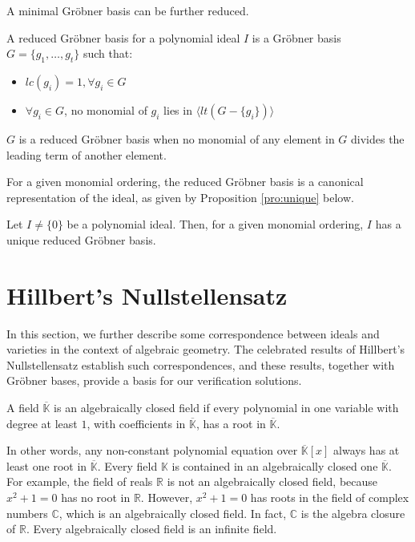 A minimal Gr\"obner basis can be further reduced.
\begin{Definition}
	A {reduced Gr\"obner basis} for a polynomial ideal $I$ is a Gr\"obner basis $G=\{g_{1},\dots,g_{t}\}$ such that:
	\begin{itemize}
		\item $lc(g_{i})=1,\forall g_{i}\in G$
		\item $\forall g_{i} \in G$, no monomial of $g_{i}$ lies in $\langle lt(G-\{g_{i}\})\rangle$
	\end{itemize}
\end{Definition}
$G$ is a reduced Gr\"obner basis when no monomial of any element in $G$ divides the leading term of another element.

For a given monomial ordering, 
the reduced Gr\"obner basis is a canonical representation of the ideal, as given by Proposition \ref{pro:unique} below.


\begin{Proposition}\label{pro:unique}
Let $I \neq \{0\}$ be a polynomial ideal. Then, for a given monomial ordering, $I$ has a unique reduced Gr\"obner basis.
\end{Proposition}

\section{Hillbert's Nullstellensatz}

In this section, we further describe some correspondence between ideals and varieties in
the context of algebraic geometry. The celebrated results of Hillbert's Nullstellensatz
establish such correspondences, and these results, together with Gr\"obner bases, 
provide a basis for our verification solutions. 

\begin{Definition}\label{def:acf}
A field $\overline {\mathbb{K}}$ is an algebraically closed field if every polynomial in one variable with degree at least $1$, with coefficients 
in $\overline {\mathbb{K}}$, has a root in $\overline {\mathbb{K}}$.
\end{Definition}
In other words, any non-constant polynomial equation over $\overline {\mathbb{K}}\left[x\right]$ always has at least one root 
in $\overline {\mathbb{K}}$. Every field $\mathbb{K}$ is contained in an algebraically closed one $\overline {\mathbb{K}}$. 
For example, the field of reals $\mathbb{R}$ is not an algebraically closed field, because $x^2+1=0$ 
has no root in $\mathbb{R}$. However, $x^2+1=0$ has roots in the field of complex numbers $\mathbb{C}$, 
which is an algebraically closed field. 
In fact, $\mathbb{C}$ is the algebra closure of $\mathbb{R}$.
Every algebraically closed field is an infinite field.

